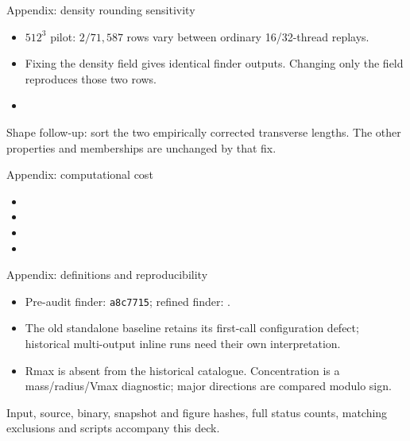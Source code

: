 \documentclass[UTF8]{beamer}
\begin{document}
\begin{frame}{Appendix: density rounding sensitivity}
\begin{itemize}
\item $512^3$ pilot: $2/71{,}587$ rows vary between ordinary 16/32-thread replays.
\item Fixing the density field gives identical finder outputs. Changing only
the field reproduces those two rows.
\item \MainNumericalAppendix
\end{itemize}\smallskip
{\small Shape follow-up: sort the two empirically corrected transverse lengths.
The other properties and memberships are unchanged by that fix.}
\end{frame}

\begin{frame}{Appendix: computational cost}
\begin{itemize}
\item \ResourceResult
\item \TimingResult
\item \ParallelResult
\item \JobResult
\end{itemize}
\end{frame}

\begin{frame}{Appendix: definitions and reproducibility}
\begin{itemize}
\item Pre-audit finder: \texttt{a8c7715}; refined finder: \texttt{\RefinedCommit}.
\item The old standalone baseline retains its first-call configuration defect;
historical multi-output inline runs need their own interpretation.
\item Rmax is absent from the historical catalogue. Concentration is a
mass/radius/Vmax diagnostic; major directions are compared modulo sign.
\end{itemize}\medskip
{\small Input, source, binary, snapshot and figure hashes, full status counts,
matching exclusions and scripts accompany this deck.}
\end{frame}
\end{document}

